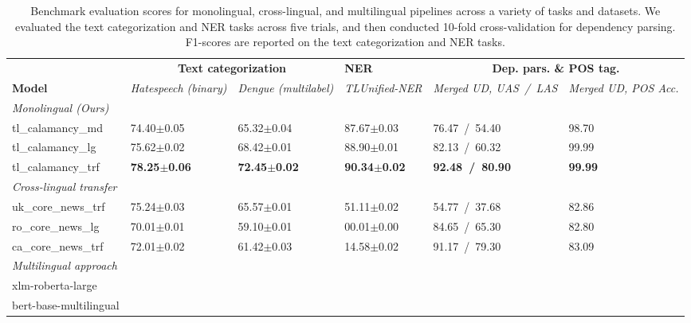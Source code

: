 \documentclass[../emnlp2023.tex]{subfiles}
\begin{document}
\begin{table*}[t]
\begin{tabular}{@{}p{4cm}p{2cm}p{2cm}p{2cm}p{2cm}p{2cm}@{}}
\toprule
                           & \multicolumn{2}{c}{\textbf{Text categorization}} & \textbf{NER} & \multicolumn{2}{c}{\textbf{Dep. pars. \& POS tag.}}                         \\ 
\textbf{Model}             & \textit{Hatespeech (binary)} & \textit{Dengue (multilabel)} & \textit{TLUnified-NER} & \textit{Merged UD, UAS~/~LAS} & \textit{Merged UD, POS Acc.} \\ \midrule 
\textit{Monolingual (Ours)}              \\
tl\_calamancy\_md          & 74.40$\pm$0.05 & 65.32$\pm$0.04 & 87.67$\pm$0.03 & 76.47~/~54.40 & 98.70\\
tl\_calamancy\_lg          & 75.62$\pm$0.02 & 68.42$\pm$0.01 & 88.90$\pm$0.01 & 82.13~/~60.32 & 99.99\\
tl\_calamancy\_trf         & \textbf{78.25$\pm$0.06} & \textbf{72.45$\pm$0.02} & \textbf{90.34$\pm$0.02} & \textbf{92.48~/~80.90} & \textbf{99.99} \\ \midrule
\textit{Cross-lingual transfer} \\
uk\_core\_news\_trf        & 75.24$\pm$0.03 & 65.57$\pm$0.01 & 51.11$\pm$0.02 & 54.77~/~37.68 & 82.86 \\
ro\_core\_news\_lg         & 70.01$\pm$0.01 & 59.10$\pm$0.01 & 00.01$\pm$0.00 & 84.65~/~65.30 & 82.80 \\
ca\_core\_news\_trf        & 72.01$\pm$0.02 & 61.42$\pm$0.03 & 14.58$\pm$0.02 & 91.17~/~79.30 & 83.09 \\ \midrule
\textit{Multilingual approach} \\
xlm-roberta-large \\
bert-base-multilingual \\
\bottomrule
\end{tabular}
\caption{
    Benchmark evaluation scores for monolingual, cross-lingual, and multilingual pipelines across a variety of tasks and datasets.
    We evaluated the text categorization and NER tasks across five trials, and then conducted 10-fold cross-validation for dependency parsing.
    F1-scores are reported on the text categorization and NER tasks.
}
\label{table:results}
\end{table*}
\end{document}
